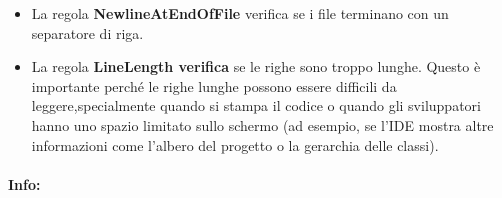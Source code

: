 \begin{itemize}
		\item La regola \textbf{\textbf{NewlineAtEndOfFile}} verifica se i file terminano con un separatore di riga.

		\item La regola \textbf{\textbf{LineLength verifica}} se le righe sono troppo lunghe. Questo è importante perché le righe lunghe possono essere difficili da leggere,specialmente quando si stampa il codice o quando gli sviluppatori hanno uno spazio limitato sullo schermo (ad esempio, se l’IDE mostra altre informazioni come l’albero del progetto o la gerarchia delle classi).

	\end{itemize}

\paragraph{Info:}

